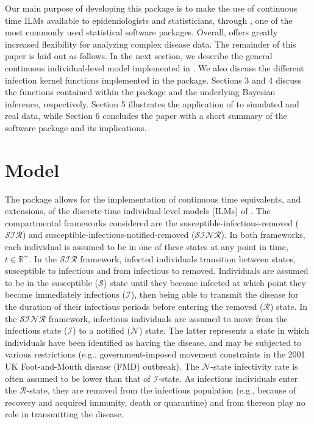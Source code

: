 \documentclass[nojss,shortnames]{jss}
\begin{document}
Our main purpose of developing this package is to make the use of continuous time ILMs available to epidemiologists and statisticians, through , one of the most commonly used statistical software packages. Overall,  offers greatly increased flexibility for analyzing complex disease data.
The remainder of this paper is laid out as follows. In the next section, we describe the general continuous individual-level model implemented in . We also discuss the different infection kernel functions implemented in the package. Sections 3 and 4 discuss the functions contained within the package and the underlying Bayesian inference, respectively. Section 5 illustrates the application of  to simulated and real data, while Section 6 concludes the paper with a short summary of the software package and its implications. 

\section{Model}\label{model}

The  package allows for the implementation of continuous time equivalents, and extensions, of the discrete-time individual-level models (ILMs) of \citet{deardon2010inference}. The compartmental frameworks considered are the susceptible-infectious-removed ($\mathcal{SIR}$) and susceptible-infectious-notified-removed ($\mathcal{SINR}$). In both frameworks, each individual is assumed to be in one of these states at any point in time, $t \in \mathbb{R}^{+}$. In the $\mathcal{SIR}$ framework, infected individuals transition between states, susceptible to infectious and from infectious to removed. 
Individuals are assumed to be in the susceptible ($\mathcal{S}$) state until they become infected at which point they become immediately infectious ($\mathcal{I}$), then being able to transmit the disease for the duration of their infectious periods before entering the removed ($\mathcal{R}$) state. In the $\mathcal{SINR}$ framework, infectious individuals are assumed to move from the infectious state ($\mathcal{I}$) to a notified ($\mathcal{N}$) state. The latter represents a state in which individuals have been identified as having the disease, and may be subjected to various restrictions (e.g., government-imposed movement constraints in the 2001 UK Foot-and-Mouth disease (FMD) outbreak). The $\mathcal{N}$-state infectivity rate is often assumed to be lower than that of $\mathcal{I}$-state. As infectious individuals enter the $\mathcal{R}$-state, they are removed from the infectious population (e.g., because of recovery and acquired immunity, death or quarantine) and from thereon play no role in transmitting the disease. 
\end{document}
